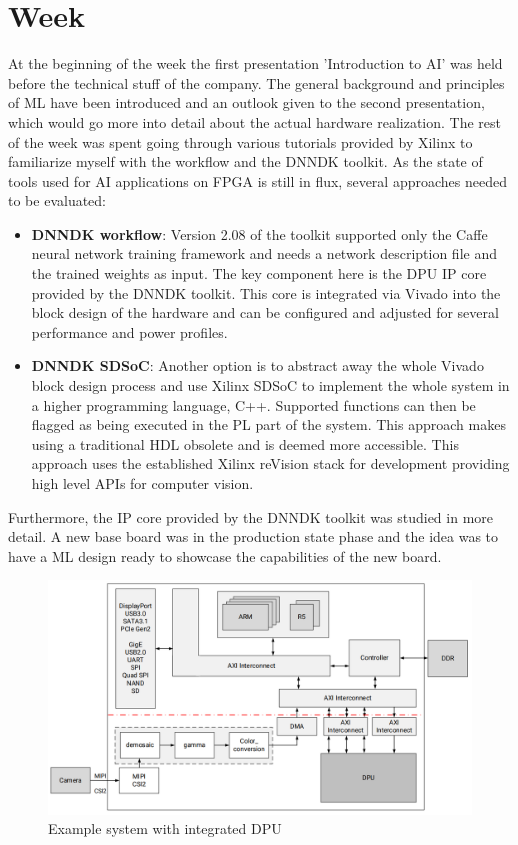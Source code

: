 \chapter{Week}
At the beginning of the week the first presentation 'Introduction to \ac{AI}' was held before the technical stuff of the company. The general background and principles of \ac{ML} have been introduced and an outlook given to the second presentation, which would go more into detail about the actual hardware realization. The rest of the week was spent going through various tutorials provided by Xilinx to familiarize myself with the workflow and the \ac{DNNDK} toolkit. As the state of tools used for \ac{AI} applications on \ac{FPGA} is still in flux, several approaches needed to be evaluated:
\begin{itemize}
	\item \textbf{\ac{DNNDK} workflow}: Version 2.08 of the toolkit supported only the Caffe neural network training framework and needs a network description file and the trained weights as input. The key component here is the \ac{DPU} \ac{IP} core provided by the \ac{DNNDK} toolkit. This core is integrated via Vivado into the block design of the hardware and can be configured and adjusted for several performance and power profiles.
	\item \textbf{\ac{DNNDK} \ac{SDSoC}}: Another option is to abstract away the whole Vivado block design process and use Xilinx \ac{SDSoC} to implement the whole system in a higher programming language, C++. Supported functions can then be flagged as being executed in the \ac{PL} part of the system. This approach makes using a traditional \ac{HDL} obsolete and is deemed more accessible. This approach uses the established Xilinx reVision stack for development providing high level \acp{API} for computer vision.
\end{itemize}
Furthermore, the \ac{IP} core provided by the \ac{DNNDK} toolkit was studied in more detail. A new base board was in the production state phase and the idea was to have a \ac{ML} design ready to showcase the capabilities of the new board.
\begin{figure}[!htb]
	\centering
		\includegraphics[width=\textwidth]{bilder/DPU_example_design.png}
		\caption{Example system with integrated \acs{DPU}}
		\label{fig:dpu_example}
\end{figure}
